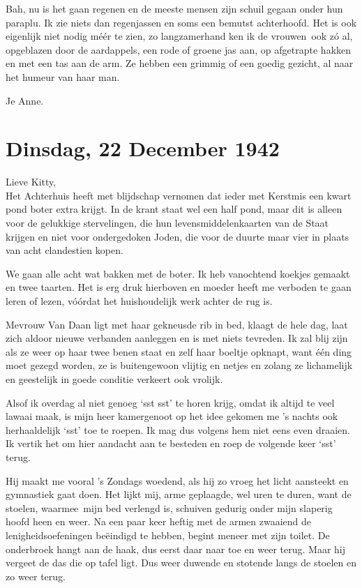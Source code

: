 \documentclass{book}
\begin{document}
Bah, nu is het gaan regenen en de meeste mensen zijn schuil gegaan onder hun
paraplu. Ik zie niets dan regenjassen en soms een bemutst achterhoofd. Het is
ook eigenlijk niet nodig méér te zien, zo langzamerhand ken ik de vrouwen~ook zó
al, opgeblazen door de aardappels, een rode of groene jas aan, op afgetrapte
hakken en met een tas aan de arm. Ze hebben een grimmig of een goedig gezicht,
al naar het humeur van haar man.

Je Anne.

\section*{Dinsdag, 22 December 1942}

Lieve Kitty,\\
Het Achterhuis heeft met blijdschap vernomen dat ieder met
Kerstmis een kwart pond boter extra krijgt. In de krant staat wel een half pond,
maar dit is alleen voor de gelukkige stervelingen, die hun levensmiddelenkaarten
van de Staat krijgen en niet voor ondergedoken Joden, die voor de duurte maar
vier in plaats van acht clandestien kopen.

We gaan alle acht wat bakken met de boter. Ik heb vanochtend koekjes gemaakt en
twee taarten. Het is erg druk hierboven en moeder heeft me verboden te gaan
leren of lezen, vóórdat het huishoudelijk werk achter de rug is.

Mevrouw Van Daan ligt met haar gekneusde rib in bed, klaagt de hele dag, laat
zich aldoor nieuwe verbanden aanleggen en is met niets tevreden. Ik zal blij
zijn als ze weer op haar twee benen staat en zelf haar boeltje opknapt, want één
ding moet gezegd worden, ze is buitengewoon vlijtig en netjes en zolang ze
lichamelijk en geestelijk in goede conditie verkeert ook vrolijk.

Alsof ik overdag al niet genoeg `sst sst' te horen krijg, omdat ik altijd te
veel lawaai maak, is mijn heer kamergenoot op het idee gekomen me 's nachts ook
herhaaldelijk `sst' toe te roepen. Ik mag dus volgens hem niet eens even
draaien. Ik vertik het om hier aandacht aan te besteden en roep de volgende keer
`sst' terug.

Hij maakt me vooral 's Zondags woedend, als hij zo vroeg het licht aansteekt en
gymnastiek gaat doen. Het lijkt mij, arme geplaagde, wel uren te duren, want de
stoelen, waarmee~mijn bed verlengd is, schuiven gedurig onder mijn slaperig
hoofd heen en weer. Na een paar keer heftig met de armen zwaaiend de
lenigheidsoefeningen beëindigd te hebben, begint meneer met zijn toilet. De
onderbroek hangt aan de haak, dus eerst daar naar toe en weer terug. Maar hij
vergeet de das die op tafel ligt. Dus weer duwende en stotende langs de stoelen
en zo weer terug.
\end{document}
